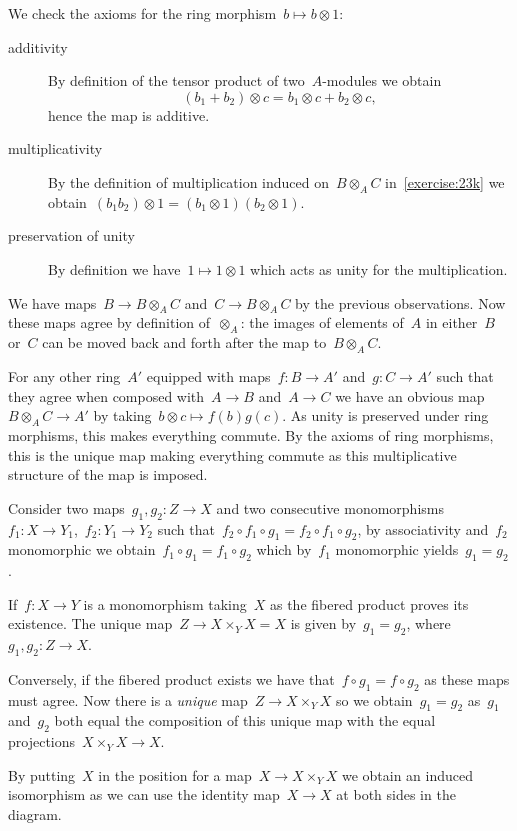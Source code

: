 \begin{exercise}
  We check the axioms for the ring morphism~$b\mapsto b\otimes 1$:
  \begin{description}
    \item[additivity] By definition of the tensor product of two~$A$\nobreakdash-modules we obtain
      \begin{equation}
        (b_1+b_2)\otimes c=b_1\otimes c+b_2\otimes c,
      \end{equation}
      hence the map is additive.  
    \item[multiplicativity] By the definition of multiplication induced on~$B\otimes_A C$ in~\autoref{exercise:23k} we obtain~$(b_1b_2)\otimes 1=(b_1\otimes 1)(b_2\otimes 1)$.

    \item[preservation of unity] By definition we have~$1\mapsto 1\otimes 1$ which acts as unity for the multiplication.
  \end{description}

  We have maps~$B\to B\otimes_A C$ and~$C\to B\otimes_A C$ by the previous observations. Now these maps agree by definition of~$\otimes_A$: the images of elements of~$A$ in either~$B$ or~$C$ can be moved back and forth after the map to~$B\otimes_A C$.

  For any other ring~$A'$ equipped with maps~$f\colon B\to A'$ and~$g\colon C\to A'$ such that they agree when composed with~$A\to B$ and~$A\to C$ we have an obvious map~$B\otimes_A C\to A'$ by taking~$b\otimes c\mapsto f(b)g(c)$. As unity is preserved under ring morphisms, this makes everything commute. By the axioms of ring morphisms, this is the unique map making everything commute as this multiplicative structure of the map is imposed.
\end{exercise}

\begin{exercise}
  Consider two maps~$g_1,g_2\colon Z\to X$ and two consecutive mono\-morphisms~$f_1\colon X\to Y_1$,~$f_2\colon Y_1\to Y_2$ such that~$f_2\circ f_1\circ g_1=f_2\circ f_1\circ g_2$, by associativity and~$f_2$ monomorphic we obtain~$f_1\circ g_1=f_1\circ g_2$ which by~$f_1$ monomorphic yields~$g_1=g_2$.
\end{exercise}

\begin{exercise}
  \label{exercise:23v}
  If~$f\colon X\to Y$ is a monomorphism taking~$X$ as the fibered product proves its existence. The unique map~$Z\to X\times_Y X=X$ is given by~$g_1=g_2$, where~$g_1,g_2\colon Z\to X$.

  Conversely, if the fibered product exists we have that~$f\circ g_1=f\circ g_2$ as these maps must agree. Now there is a \emph{unique} map~$Z\to X\times_Y X$ so we obtain~$g_1=g_2$ as~$g_1$ and~$g_2$ both equal the composition of this unique map with the equal projections~$X\times_Y X\to X$.

  By putting~$X$ in the position for a map~$X\to X\times_Y X$ we obtain an induced isomorphism as we can use the identity map~$X\to X$ at both sides in the diagram.
\end{exercise}

